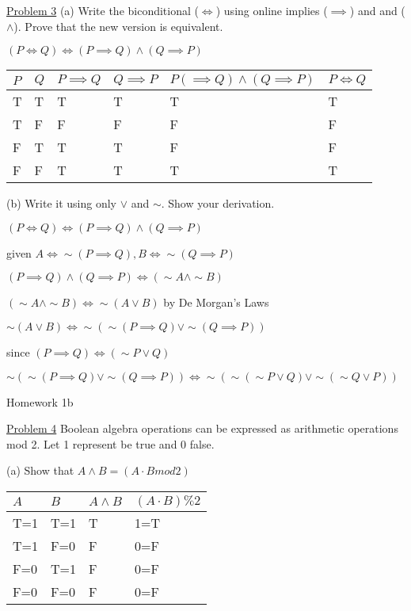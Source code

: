 \documentclass{article}
\begin{document}
\underline{Problem 3}
(a) Write the biconditional ($\Leftrightarrow$) using online implies ($\implies$) and and ($\land$). Prove that the new version is equivalent.
\begin{center}
$(P\Leftrightarrow Q)\iff (P\implies Q)\land (Q\implies P)$

  \begin{tabular}{|l|l|l|l|l|l|}
    \hline $P$&$Q$&$P\implies Q$&$Q\implies P$&$P(\implies Q)\land (Q\implies P)$&$P\Leftrightarrow Q$\\
    \hline T&T&T&T&T&T \\
    \hline T&F&F&F&F&F \\
    \hline F&T&T&T&F&F \\
    \hline F&F&T&T&T&T \\
    \hline
  \end{tabular}
\end{center}
(b) Write it using only $\lor$ and $\sim$. Show your derivation.
\begin{center}
  $(P\Leftrightarrow Q)\iff (P\implies Q)\land (Q\implies P)$

  given  $A\iff \sim (P\implies Q), B\iff \sim (Q\implies P)$

  $(P\implies Q)\land (Q\implies P)\iff (\sim A\land \sim B)$

  $(\sim A\land \sim B) \iff \sim(A\lor B)$ by De Morgan's Laws

  $\sim(A\lor B)\iff \sim(\sim (P\implies Q) \lor \sim (Q\implies P))$
  
  since $(P\implies Q)\iff(\sim P \lor Q)$

  $\sim(\sim (P\implies Q) \lor \sim (Q\implies P)) \iff \sim(\sim (\sim P \lor Q) \lor \sim (\sim Q\lor P))$
\end{center}
\newpage
\begin{center}
Homework 1b
\end{center}

\underline{Problem 4}
Boolean algebra operations can be expressed as arithmetic operations mod 2. Let 1 represent be true and 0 false.\newline

(a) Show that $A\land B = (A\cdot B mod 2)$

\begin{tabular}{|l|l|l|l|}
  \hline $A$ & $B$ & $A\land B$ & $(A\cdot B)\%2$\\
  \hline T=1 & T=1 & T & 1=T\\
  \hline T=1 & F=0 & F & 0=F\\
  \hline F=0 & T=1 & F & 0=F\\
  \hline F=0 & F=0 & F & 0=F\\
  \hline 
\end{tabular}\newline
\end{document}
